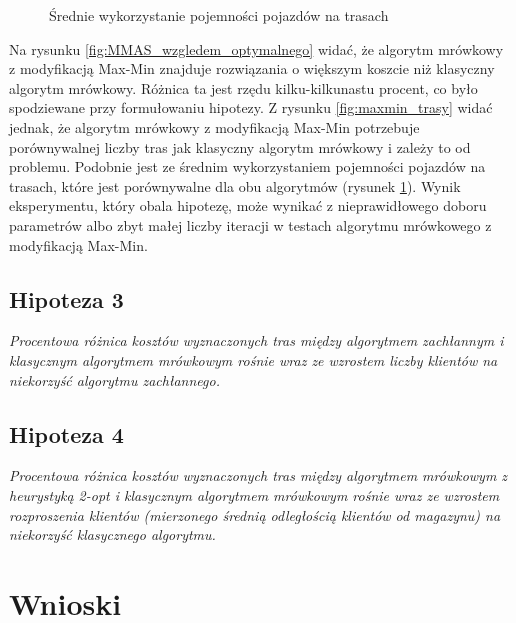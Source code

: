 \documentclass{article}
\begin{document}
\begin{figure}[H]
\begin{minipage}{0.48\textwidth}
        \caption{Średnie wykorzystanie pojemności pojazdów na trasach}
        \label{fig:max_min_capacity}
    \end{minipage}
\end{figure}

\noindent Na rysunku \ref{fig:MMAS_wzgledem_optymalnego} widać, że algorytm mrówkowy z modyfikacją Max-Min znajduje rozwiązania o większym koszcie niż klasyczny algorytm mrówkowy. Różnica ta jest rzędu kilku-kilkunastu procent, co było spodziewane przy formułowaniu hipotezy. Z rysunku \ref{fig:maxmin_trasy} widać jednak, że algorytm mrówkowy z modyfikacją Max-Min potrzebuje porównywalnej liczby tras jak klasyczny algorytm mrówkowy i zależy to od problemu. Podobnie jest ze średnim wykorzystaniem pojemności pojazdów na trasach, które jest porównywalne dla obu algorytmów (rysunek \ref{fig:max_min_capacity}). Wynik eksperymentu, który obala hipotezę, może wynikać z nieprawidłowego doboru parametrów albo zbyt małej liczby iteracji w testach algorytmu mrówkowego z modyfikacją Max-Min.

\subsection{Hipoteza 3}
\textit{Procentowa różnica kosztów wyznaczonych tras między algorytmem zachłannym i klasycznym algorytmem mrówkowym rośnie wraz ze wzrostem liczby klientów na niekorzyść algorytmu zachłannego.}



\subsection{Hipoteza 4}
\textit{Procentowa różnica kosztów wyznaczonych tras między algorytmem mrówkowym z heurystyką 2-opt i klasycznym algorytmem mrówkowym rośnie wraz ze wzrostem rozproszenia klientów (mierzonego średnią odległością klientów od magazynu) na niekorzyść klasycznego algorytmu.}

\section{Wnioski}


\nocite{*}


\end{document}
